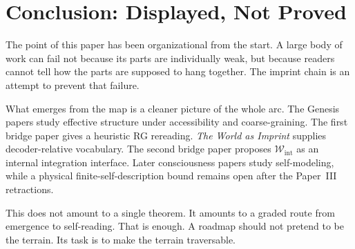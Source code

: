 \documentclass[12pt,a4paper]{article}
\begin{document}
\section{Conclusion: Displayed, Not Proved}

The point of this paper has been organizational from the start. A large body of work can fail not because its parts are individually weak, but because readers cannot tell how the parts are supposed to hang together. The imprint chain is an attempt to prevent that failure.

What emerges from the map is a cleaner picture of the whole arc. The
Genesis papers study effective structure under accessibility and
coarse-graining. The first bridge paper gives a heuristic RG rereading.
\emph{The World as Imprint} supplies decoder-relative vocabulary. The
second bridge paper proposes \(\mathcal W_{\mathrm{int}}\) as an
internal integration interface. Later consciousness papers study
self-modeling, while a physical finite-self-description bound remains
open after the Paper~III retractions.

This does not amount to a single theorem. It amounts to a graded route from emergence to self-reading. That is enough. A roadmap should not pretend to be the terrain. Its task is to make the terrain traversable.
\end{document}
